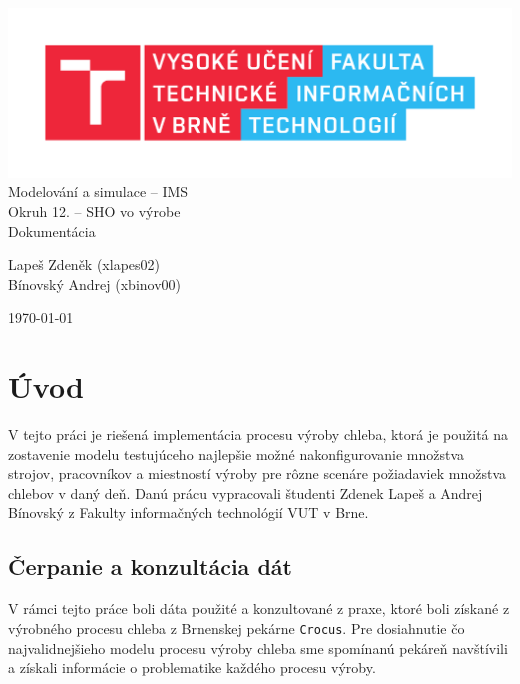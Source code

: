 \documentclass[a4paper, 10pt]{article}
\begin{document}
    \begin{titlepage}
        \begin{center}
            \includegraphics[width=0.77\linewidth]{src/FIT_logo} \\
            \Huge{Modelování a simulace -- IMS} \\
            \huge{Okruh 12. -- SHO vo výrobe} \\
            \Large{Dokumentácia}
        \end{center}

        \begin{flushleft}
            \Large{Lapeš Zdeněk (xlapes02)} \\
            \Large{Bínovský Andrej (xbinov00)}
        \end{flushleft}
        \vspace{-12mm}
        \hfill\Large{\today}
    \end{titlepage}


    \tableofcontents
    \newpage



    \section{Úvod}
    V tejto práci je riešená implementácia procesu výroby chleba, ktorá je použitá na zostavenie modelu testujúceho
    najlepšie možné nakonfigurovanie množstva strojov, pracovníkov a miestností výroby pre rôzne scenáre požiadaviek
    množstva chlebov v daný deň. Danú prácu vypracovali študenti Zdenek Lapeš a Andrej Bínovský z Fakulty informačných
    technológií VUT v Brne.

    \subsection{Čerpanie a konzultácia dát}
    V rámci tejto práce boli dáta použité a konzultované z praxe, ktoré boli získané z výrobného procesu chleba
    z Brnenskej pekárne \texttt{Crocus}\cite{Crocus}. Pre dosiahnutie čo najvalidnejšieho modelu procesu výroby chleba sme
    spomínanú pekáreň navštívili a získali informácie o problematike každého procesu výroby.
\end{document}
